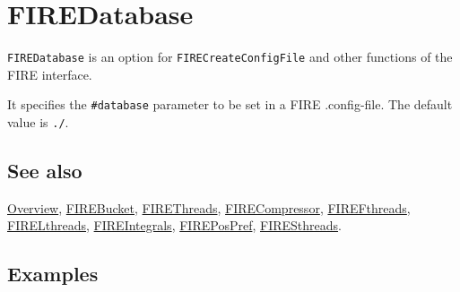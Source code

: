 \documentclass[../FeynHelpersManual.tex]{subfiles}
\begin{document}
\hypertarget{firedatabase}{
\section{FIREDatabase}\label{firedatabase}}

\texttt{FIREDatabase} is an option for \texttt{FIRECreateConfigFile} and
other functions of the FIRE interface.

It specifies the \texttt{\#{}\allowbreak{}database} parameter to be set
in a FIRE .config-file. The default value is \texttt{./}.

\subsection{See also}

\hyperlink{toc}{Overview}, \hyperlink{firebucket}{FIREBucket},
\hyperlink{firethreads}{FIREThreads},
\hyperlink{firecompressor}{FIRECompressor},
\hyperlink{firefthreads}{FIREFthreads},
\hyperlink{firelthreads}{FIRELthreads},
\hyperlink{fireintegrals}{FIREIntegrals},
\hyperlink{firepospref}{FIREPosPref},
\hyperlink{firesthreads}{FIRESthreads}.

\subsection{Examples}
\end{document}
